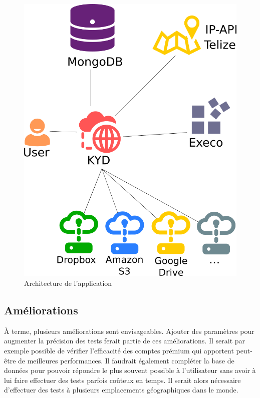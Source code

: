 \documentclass[10pt]{article}
\begin{document}
\begin{figure}[h] \centering \includegraphics[scale=0.3]{architecture.png}
\caption{Architecture de l'application} \label{fig:Architecture de
l'application} \end{figure}

\subsection{Améliorations}

À terme, plusieurs améliorations sont envisageables. Ajouter des paramètres
pour augmenter la précision des tests ferait partie de ces améliorations. Il
serait par exemple possible de vérifier l'efficacité des comptes prémium qui
apportent peut-être de meilleures performances. Il faudrait également compléter
la base de données pour pouvoir répondre le plus souvent possible à
l'utilisateur sans avoir à lui faire effectuer des tests parfois coûteux en
temps. Il serait alors nécessaire d'effectuer des tests à plusieurs
emplacements géographiques dans le monde.
\end{document}
